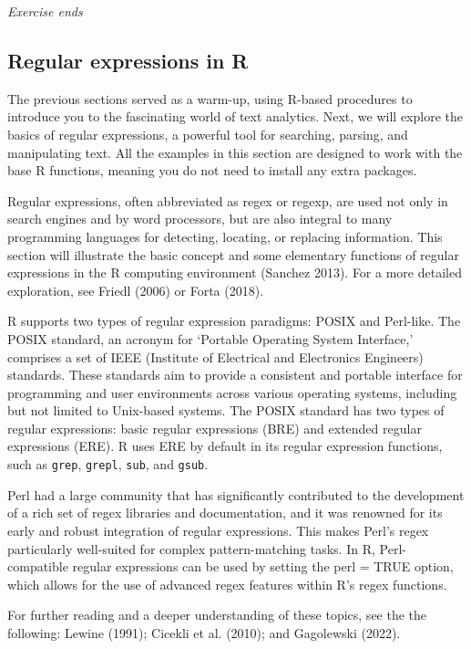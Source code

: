 \emph{Exercise ends}

\subsection{Regular expressions in R}\label{regular-expressions-in-r}

The previous sections served as a warm-up, using R-based procedures to
introduce you to the fascinating world of text analytics. Next, we will
explore the basics of regular expressions, a powerful tool for
searching, parsing, and manipulating text. All the examples in this
section are designed to work with the base R functions, meaning you do not
need to install any extra packages.

Regular expressions, often abbreviated as regex or regexp, are used not
only in search engines and by word processors, but are also integral to many
programming languages for detecting, locating, or replacing information.
This section will illustrate the basic concept and some elementary
functions of regular expressions in the R computing environment
(Sanchez 2013). For a more detailed exploration, see Friedl (2006)
or Forta (2018).

R supports two types of regular expression paradigms: POSIX and
Perl-like. The POSIX standard, an acronym for `Portable Operating System
Interface,' comprises a set of IEEE (Institute of Electrical and
Electronics Engineers) standards. These standards aim to provide a
consistent and portable interface for programming and user environments
across various operating systems, including but not limited to
Unix-based systems. The POSIX standard has two types of regular
expressions: basic regular expressions (BRE) and extended regular
expressions (ERE). R uses ERE by default in its regular
expression functions, such as \texttt{grep}, \texttt{grepl}, \texttt{sub}, and \texttt{gsub}.

Perl had a large community that has significantly contributed to the
development of a rich set of regex libraries and documentation, and it was renowned for its early and robust integration of regular expressions. This
makes Perl's regex particularly well-suited for complex pattern-matching
tasks. In R, Perl-compatible regular expressions can be used by
setting the perl = TRUE option, which allows for the use of advanced regex features
within R's regex functions.

For further reading and a deeper understanding of these topics, see the
the following: Lewine (1991); Cicekli et al. (2010); and Gagolewski
(2022).

